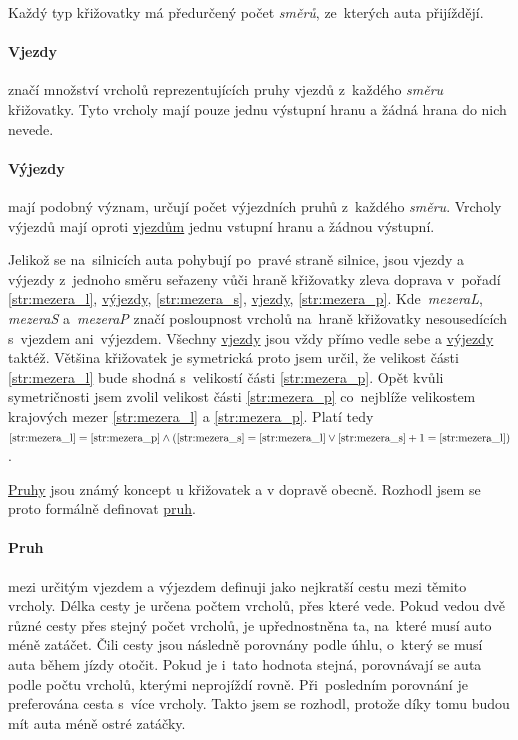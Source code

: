 Každý typ křižovatky má předurčený počet \emph{směrů}, ze~kterých auta přijíždějí.

\paragraph{Vjezdy}\label{par:vjezdy} značí množství vrcholů reprezentujících pruhy vjezdů z~každého \emph{směru} křižovatky.
Tyto vrcholy mají pouze jednu výstupní hranu a žádná hrana do nich nevede.

\paragraph{Výjezdy}\label{par:vyjezdy} mají podobný význam, určují počet výjezdních pruhů z~každého \emph{směru}.
Vrcholy výjezdů mají oproti \hyperref[par:vjezdy]{vjezdům} jednu vstupní hranu a žádnou výstupní.

Jelikož se na~silnicích auta pohybují po~pravé straně silnice,
jsou vjezdy a výjezdy z~jednoho směru seřazeny vůči hraně křižovatky zleva doprava v~pořadí
\ref{str:mezera_l}, \hyperref[par:vyjezdy]{výjezdy}, \ref{str:mezera_s}, \hyperref[par:vyjezdy]{vjezdy}, \ref{str:mezera_p}.
Kde~\emph{mezeraL}, \emph{mezeraS}
a~\emph{mezeraP} značí posloupnost vrcholů na~hraně křižovatky
nesousedících s~vjezdem ani~výjezdem.
Všechny \hyperref[par:vjezdy]{vjezdy} jsou vždy přímo vedle sebe a \hyperref[par:vyjezdy]{výjezdy} taktéž.
Většina křižovatek je symetrická proto jsem určil, že velikost části \ref{str:mezera_l} bude shodná s~velikostí části \ref{str:mezera_p}.
Opět kvůli symetričnosti jsem zvolil velikost části \ref{str:mezera_p} co~nejblíže velikostem
krajových mezer \ref{str:mezera_l} a \ref{str:mezera_p}.
Platí tedy $\ref{str:mezera_l}=\ref{str:mezera_p}\wedge(\ref{str:mezera_s}=\ref{str:mezera_l}\vee\ref{str:mezera_s}+1=\ref{str:mezera_l})$.

\hyperref[par:pruh]{Pruhy} jsou známý koncept u křižovatek a v dopravě obecně.
Rozhodl jsem se proto formálně definovat \hyperref[par:pruh]{pruh}.

\paragraph{Pruh}\label{par:pruh} mezi určitým vjezdem a výjezdem definuji jako nejkratší cestu mezi těmito vrcholy.
Délka cesty je určena počtem vrcholů, přes které vede.
Pokud vedou dvě různé cesty přes stejný počet vrcholů, je upřednostněna ta, na~které musí auto méně zatáčet.
Čili cesty jsou následně porovnány podle úhlu, o~který se musí auta během jízdy otočit.
Pokud je i~tato hodnota stejná, porovnávají se auta podle počtu vrcholů, kterými neprojíždí rovně.
Při~posledním porovnání je preferována cesta s~více vrcholy.
Takto jsem se rozhodl, protože díky tomu budou mít auta méně ostré zatáčky.

